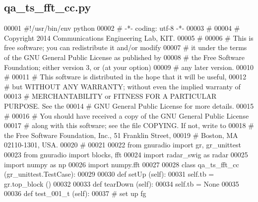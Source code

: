 \subsection{qa\+\_\+ts\+\_\+fft\+\_\+cc.\+py}
\label{qa__ts__fft__cc_8py_source}

\begin{DoxyCode}
00001 \textcolor{comment}{#!/usr/bin/env python}
00002 \textcolor{comment}{# -*- coding: utf-8 -*-}
00003 \textcolor{comment}{#}
00004 \textcolor{comment}{# Copyright 2014 Communications Engineering Lab, KIT.}
00005 \textcolor{comment}{#}
00006 \textcolor{comment}{# This is free software; you can redistribute it and/or modify}
00007 \textcolor{comment}{# it under the terms of the GNU General Public License as published by}
00008 \textcolor{comment}{# the Free Software Foundation; either version 3, or (at your option)}
00009 \textcolor{comment}{# any later version.}
00010 \textcolor{comment}{#}
00011 \textcolor{comment}{# This software is distributed in the hope that it will be useful,}
00012 \textcolor{comment}{# but WITHOUT ANY WARRANTY; without even the implied warranty of}
00013 \textcolor{comment}{# MERCHANTABILITY or FITNESS FOR A PARTICULAR PURPOSE.  See the}
00014 \textcolor{comment}{# GNU General Public License for more details.}
00015 \textcolor{comment}{#}
00016 \textcolor{comment}{# You should have received a copy of the GNU General Public License}
00017 \textcolor{comment}{# along with this software; see the file COPYING.  If not, write to}
00018 \textcolor{comment}{# the Free Software Foundation, Inc., 51 Franklin Street,}
00019 \textcolor{comment}{# Boston, MA 02110-1301, USA.}
00020 \textcolor{comment}{#}
00021 
00022 \textcolor{keyword}{from} gnuradio \textcolor{keyword}{import} gr, gr\_unittest
00023 \textcolor{keyword}{from} gnuradio \textcolor{keyword}{import} blocks, fft
00024 \textcolor{keyword}{import} radar\_swig \textcolor{keyword}{as} radar
00025 \textcolor{keyword}{import} numpy \textcolor{keyword}{as} np
00026 \textcolor{keyword}{import} numpy.fft
00027 
00028 \textcolor{keyword}{class }qa_ts_fft_cc (gr\_unittest.TestCase):
00029 
00030     \textcolor{keyword}{def }setUp (self):
00031         self.tb = gr.top\_block ()
00032 
00033     \textcolor{keyword}{def }tearDown (self):
00034         self.tb = \textcolor{keywordtype}{None}
00035 
00036     \textcolor{keyword}{def }test_001_t (self):
00037         \textcolor{comment}{# set up fg}

\end{DoxyCode}
